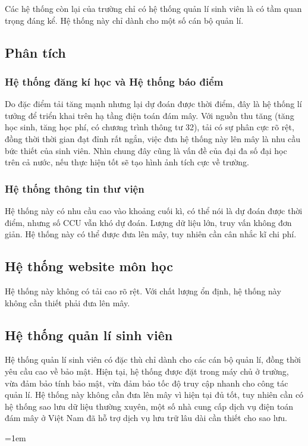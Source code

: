 \documentclass{article}
\begin{document}
Các hệ thống còn lại của trường chỉ có hệ thống quản lí sinh viên là có tầm quan
trọng đáng kể. Hệ thống này chỉ dành cho một số cán bộ quản lí.

\subsection{Phân tích}

\subsubsection{Hệ thống đăng kí học và Hệ thống báo điểm}

Do đặc điểm tải tăng mạnh nhưng lại dự đoán được thời điểm, đây là hệ thống lí
tưởng để triển khai trên hạ tầng điện toán đám mây. Với nguồn thu tăng (tăng học
sinh, tăng học phí, có chương trình thông tư 32), tải có sự phân cực rõ rệt,
đồng thời thời gian đạt đỉnh rất ngắn, việc đưa hệ thống này lên mây là nhu cầu
bức thiết của sinh viên. Nhìn chung đây cũng là vấn đề của đại đa số đại học
trên cả nước, nếu thực hiện tốt sẽ tạo hình ảnh tích cực về trường.

\subsubsection{Hệ thống thông tin thư viện}

Hệ thống này có nhu cầu cao vào khoảng cuối kì, có thể nói là dự đoán được thời
điểm, nhưng số CCU vẫn khó dự đoán. Lượng dữ liệu lớn, truy vấn không đơn giản.
Hệ thống này có thể được đưa lên mây, tuy nhiên cần cân nhắc kĩ chi phí.

\subsection{Hệ thống website môn học}

Hệ thống này không có tải cao rõ rệt. Với chất lượng ổn định, hệ thống này không
cần thiết phải đưa lên mây.

\subsection{Hệ thống quản lí sinh viên}

Hệ thống quản lí sinh viên có đặc thù chỉ dành cho các cán bộ quản lí, đồng thời
yêu cầu cao về bảo mật. Hiện tại, hệ thống được đặt trong máy chủ ở trường, vừa
đảm bảo tính bảo mật, vừa đảm bảo tốc độ truy cập nhanh cho công tác quản lí. Hệ
thống này không cần đưa lên mây vì hiện tại đủ tốt, tuy nhiên cần có hệ thống
sao lưu dữ liệu thường xuyên, một số nhà cung cấp dịch vụ điện toán đám mây ở
Việt Nam đã hỗ trợ dịch vụ lưu trữ lâu dài cần thiết cho sao lưu.

\emergencystretch=1em
\printbibliography[title={Tài liệu tham khảo}]
\end{document}
